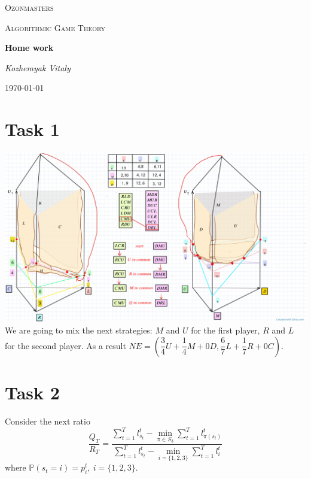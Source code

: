 \documentclass[a4paper, 12pt]{article}
\begin{document}
 

\begin{titlepage}
	\centering
	{\scshape\LARGE Ozonmasters \par}
	\vspace{1cm}
	{\scshape\Large Algorithmic Game Theory \par}
	\vspace{1.5cm}
	{\huge\bfseries Home work \par}
	\vspace{2cm}
	{\Large\itshape Kozhemyak Vitaly \par}
	\vfill

	{\large \today\par}
\end{titlepage}
  
\tableofcontents

\newpage
 
\section{Task 1}
\includegraphics[width=\textwidth]{Images/Task1.png}
We are going to mix the next strategies: $M$ and $U$ for the first player, $R$ and $L$ for the second player. As a result $NE = \left( \dfrac{3}{4}U + \dfrac{1}{4} M + 0 D, \dfrac{6}{7}L + \dfrac{1}{7} R + 0 C\right).$ 
\section{Task 2}
Consider the next ratio
$$
\dfrac{Q_T}{R_T} = \dfrac{\sum \limits_{t=1}^T l_{s_t}^t - \min \limits_{\pi \in S_3} \sum \limits_{t=1}^T l_{\pi(s_t)}^t}{\sum \limits_{t=1}^T l_{s_t}^t - \min \limits_{i = \{1, 2, 3 \}} \sum \limits_{t=1}^T l_{i}^t}
$$
where $\mathbb{P}(s_t = i) = p_i^t, ~ i = \{1, 2, 3 \}.$
\end{document}
